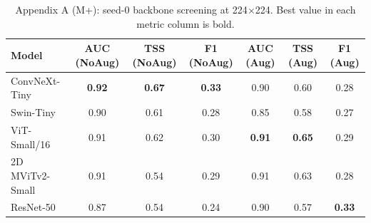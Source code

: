 \begin{table}[p]
\centering
\scriptsize
\caption{Appendix A (M+): seed-0 backbone screening at 224$\times$224. Best value in each metric column is bold.}
\label{tab:appA_seed0_mplus}
\begin{tabular}{lcccccc}
\toprule
Model & AUC (NoAug) & TSS (NoAug) & F1 (NoAug) & AUC (Aug) & TSS (Aug) & F1 (Aug) \\
\midrule
ConvNeXt-Tiny & \textbf{0.92} & \textbf{0.67} & \textbf{0.33} & 0.90 & 0.60 & 0.28 \\
Swin-Tiny & 0.90 & 0.61 & 0.28 & 0.85 & 0.58 & 0.27 \\
ViT-Small/16 & 0.91 & 0.62 & 0.30 & \textbf{0.91} & \textbf{0.65} & 0.29 \\
2D MViTv2-Small & 0.91 & 0.54 & 0.29 & 0.91 & 0.63 & 0.28 \\
ResNet-50 & 0.87 & 0.54 & 0.24 & 0.90 & 0.57 & \textbf{0.33} \\
\bottomrule
\end{tabular}
\end{table}
